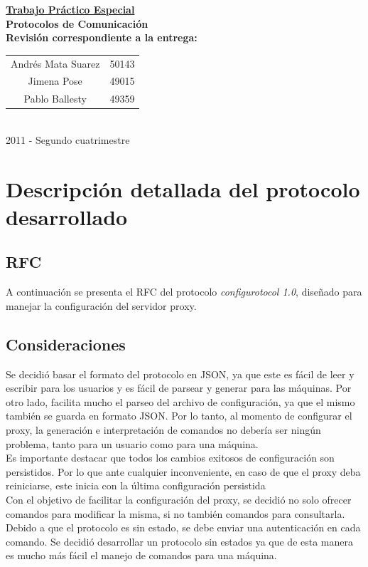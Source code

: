 \documentclass[a4paper,10pt]{article}
\begin{document}
\begin{titlepage}
\begin{center}
 \huge \underline{\textbf{Trabajo Práctico Especial}}\\[0.05cm]
 \normalsize \textbf{Protocolos de Comunicación}\\[0.25cm]
 \normalsize \textbf{Revisión correspondiente a la entrega: }\\[1cm]

\large
\begin{tabular}{c @{ - } l}
 Andrés Mata Suarez & 50143 \\
 Jimena Pose & 49015 \\
 Pablo Ballesty & 49359 \\
\end{tabular}\\[19.4cm]
 2011 - Segundo cuatrimestre
\end{center}

\end{titlepage}

\setcounter{tocdepth}{2}
\tableofcontents


\newpage

\section{Descripción detallada del protocolo desarrollado}

\subsection{RFC}
A continuación se presenta el RFC del protocolo \textit{configurotocol 1.0}, diseñado para manejar la configuración
del servidor proxy.



\subsection{Consideraciones}
Se decidió basar el formato del protocolo en JSON, ya que este es fácil de leer y escribir para los usuarios y es
fácil de parsear y generar para las máquinas. Por otro lado, facilita mucho el parseo del archivo de configuración,
ya que el mismo también se guarda en formato JSON. Por lo tanto, al momento de configurar el proxy, la generación 
e interpretación de comandos no debería ser ningún problema, tanto para un usuario como para una máquina.\\
Es importante destacar que todos los cambios exitosos de configuración son persistidos. Por lo que ante cualquier
inconveniente, en caso de que el proxy deba reiniciarse, este inicia con la última configuración persistida\\
Con el objetivo de facilitar la configuración del proxy, se decidió no solo ofrecer comandos para modificar la misma,
si no también comandos para consultarla.\\
Debido a que el protocolo es sin estado, se debe enviar una autenticación en cada comando. Se decidió desarrollar
un protocolo sin estados ya que de esta manera es mucho más fácil el manejo de comandos para una máquina.
\end{document}
